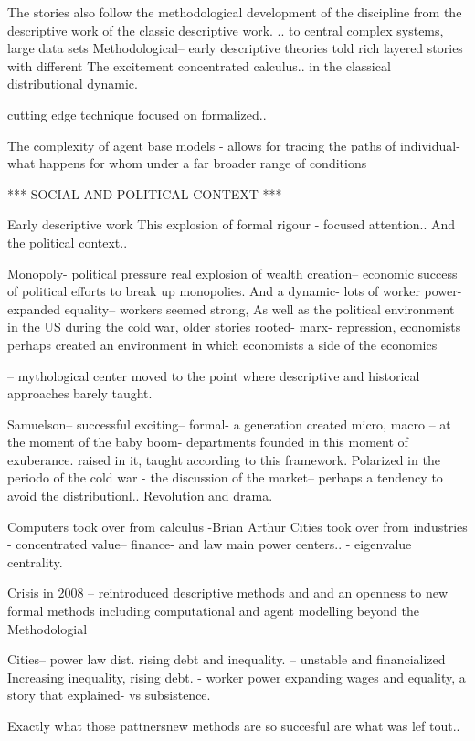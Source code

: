 The stories also follow the methodological development of the discipline from the descriptive work of the classic descriptive work. ..
to central complex systems, large data sets
Methodological-- early descriptive theories told rich layered stories with different
The excitement concentrated  calculus.. in the classical distributional dynamic.

cutting edge technique focused on formalized.. 


The complexity of agent base models - allows for tracing the paths of individual- what happens for whom under a far broader range of conditions



*** SOCIAL AND POLITICAL CONTEXT ***

Early descriptive work
This explosion of formal rigour - focused attention.. 
And the political context..


Monopoly- political pressure real explosion of wealth creation-- economic success of political efforts to break up monopolies.
And a dynamic- lots of worker power- expanded equality-- workers seemed strong, 
As well as the political environment in the US during the cold war, older stories rooted- marx- repression, economists perhaps created an environment in which economists
a side of the economics

-- mythological center moved to the point where descriptive and historical approaches barely taught.

Samuelson-- successful exciting-- formal-
a generation
created micro, macro
-- at the moment of the baby boom- departments founded in this moment of exuberance. raised in it, taught according to this framework.
Polarized in the periodo of the cold war - the discussion of the market-- perhaps a tendency to avoid the distributionl.. Revolution and drama.

Computers took over from calculus -Brian Arthur
Cities took over from industries - concentrated value-- finance- and law main power centers.. - eigenvalue centrality.

Crisis in 2008 -- reintroduced descriptive methods and and an openness to new formal methods including computational and agent modelling beyond the 
Methodologial

Cities-- power law dist. rising debt and inequality. -- unstable and financialized
Increasing inequality, rising debt. - worker power expanding wages and equality, a story that explained- vs subsistence.


Exactly what those pattnersnew methods are so succesful are what was lef tout..

